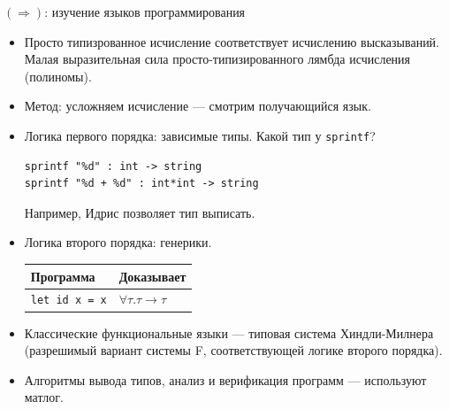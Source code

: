 \documentclass[aspectratio=169]{beamer}
\begin{document}
\begin{frame}[fragile]{$(\Rightarrow)$: изучение языков программирования}
\begin{itemize}
\item Просто типизрованное исчисление соответствует исчислению высказываний.
Малая выразительная сила просто-типизированного лямбда исчисления (полиномы).
\item Метод: усложняем исчисление --- смотрим получающийся язык.
\item Логика первого порядка: зависимые типы.
Какой тип у \verb!sprintf!?
\begin{center}
\begin{verbatim} 
sprintf "%d" : int -> string
sprintf "%d + %d" : int*int -> string
\end{verbatim}
\end{center}

Например, Идрис позволяет тип выписать.

\item Логика второго порядка: генерики.

\begin{center}
\begin{tabular}{l|l}
Программа & Доказывает\\\hline
\verb!let id x = x! & $\forall \tau.\tau \rightarrow \tau$
\end{tabular}\end{center}

\item Классические функциональные языки --- типовая система Хиндли-Милнера 
(разрешимый вариант системы F, соответствующей логике второго порядка).

\item Алгоритмы вывода типов, анализ и верификация программ --- используют матлог.
\end{itemize}
\end{frame}
\end{document}
